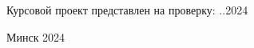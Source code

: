 \begin{titlepage}
\begin{flushright}
\begin{minipage}{9.3cm}
        Курсовой проект представлен на проверку: \underline{\hspace*{1.4cm}}.\underline{\hspace*{1.4cm}}.2024\\
        \underline{\hspace*{5.6cm}}
        
    \end{minipage}
  \end{flushright}
  
  \vfill
  \begin{center}
    {\normalsize Минск 2024}
    \end{center}
\end{titlepage}
